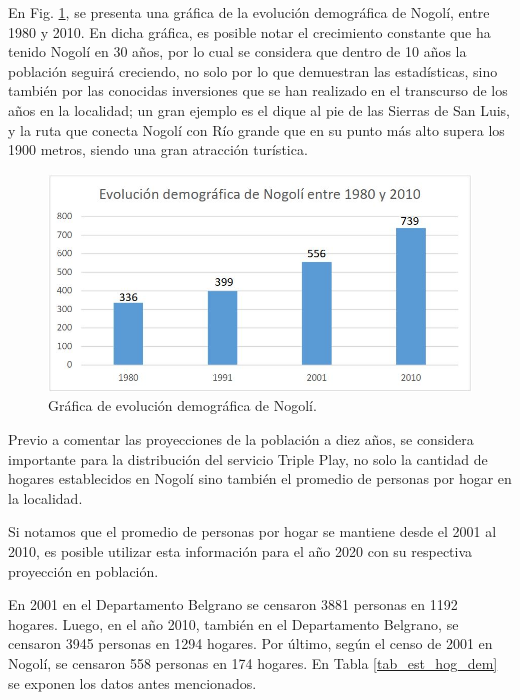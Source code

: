 \documentclass[12pt,a4paper]{book}
\begin{document}
En Fig. \ref{fig_evolucion_dem}, se presenta una gráfica de la evolución demográfica de Nogolí, entre 1980 y 2010. En dicha gráfica, es posible notar el crecimiento constante que ha tenido Nogolí en 30 años, por lo cual se considera que dentro de 10 años la población seguirá creciendo, no solo por lo que demuestran las estadísticas, sino también por las conocidas inversiones que se han realizado en el transcurso de los años en la localidad; un gran ejemplo es el dique al pie de las Sierras de San Luis, y la ruta que conecta Nogolí con Río grande que en su punto más alto supera los 1900 metros, siendo una gran atracción turística.

\begin{figure} [H]
\centering
\includegraphics[width= 15cm]{../figuras/4_1_Fig2.jpg}
\caption{Gráfica de evolución demográfica de Nogolí.}
\label{fig_evolucion_dem}
\end{figure}	

Previo a comentar las proyecciones de la población a diez años, se considera importante para la distribución del servicio Triple Play, no solo la cantidad de hogares establecidos en Nogolí sino también el promedio de personas por hogar en la localidad.

\medskip 

Si notamos que el promedio de personas por hogar se mantiene desde el 2001 al 2010, es posible utilizar esta información para el año 2020 con su respectiva proyección en población.

\medskip 

En 2001 en el Departamento Belgrano se censaron 3881 personas en 1192 hogares. Luego, en el año 2010, también en el Departamento Belgrano, se censaron 3945 personas en 1294 hogares. Por último, según el censo de 2001 en Nogolí, se censaron 558 personas en 174 hogares. En Tabla \ref{tab_est_hog_dem} se exponen los datos antes mencionados.
\end{document}

